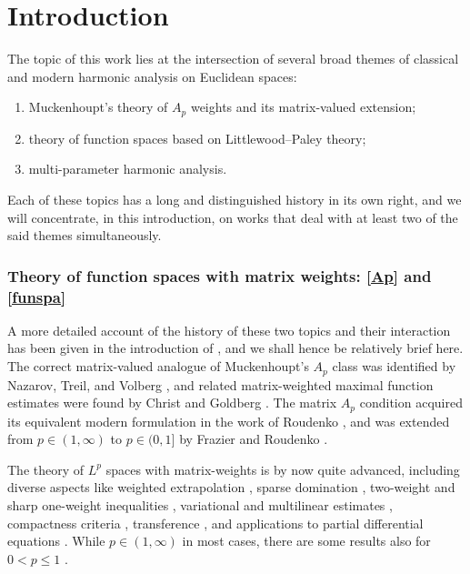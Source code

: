 \documentclass[11pt, reqno]{amsart}
\theoremstyle{definition}
\theoremstyle{remark}
\numberwithin{equation}{section}
\begin{document}
\maketitle


\tableofcontents

\section{Introduction}

The topic of this work lies at the intersection of several broad themes of classical and modern harmonic analysis on Euclidean spaces:
\begin{enumerate}[\rm(i)]
\item\label{Ap} Muckenhoupt's theory of $A_p$ weights and its
matrix-valued extension;

\item\label{funspa} theory of function spaces based on Littlewood--Paley theory;

\item\label{multi} multi-parameter harmonic analysis.
\end{enumerate}
Each of these topics has a long and distinguished history in its own right, and we will concentrate, in this introduction, on works that deal with at least two of the said themes simultaneously.

\subsubsection*{Theory of function spaces with matrix weights: \eqref{Ap} and \eqref{funspa}}
A more detailed account of the history of these two topics and their interaction has been given in the introduction of \cite{BHYY:1a}, and we shall hence be relatively brief here.
The correct matrix-valued analogue of Muckenhoupt's $A_p$ class was identified by Nazarov, Treil, and Volberg \cite{NT96,TV97,Vol97}, and related matrix-weighted maximal function estimates were found by Christ and Goldberg \cite{CG01,Gold03}. The matrix $A_p$ condition acquired its equivalent modern formulation in the work of Roudenko \cite{Roud03}, and was extended from $p\in(1,\infty)$ to $p\in(0,1]$ by Frazier and Roudenko \cite{FR04}.

The theory of $L^p$ spaces with matrix-weights is by now quite advanced, including diverse aspects like
weighted extrapolation \cite{BCU,cs25},
sparse domination \cite{CDO18,dhl20,Lau25,NPTV17},
two-weight \cite{cim18}
and sharp one-weight inequalities \cite{DPTV,HPV19,llor23},
variational \cite{DLY21} and
multilinear estimates \cite{KN26},
compactness criteria \cite{LYZ23},
transference \cite{nie12},
and applications to partial differential equations \cite{CUMR16,ID24,IM19}.
While $p\in(1,\infty)$ in most cases, there are some results also for $0<p\leq 1$ \cite{nie25b}.
\end{document}
